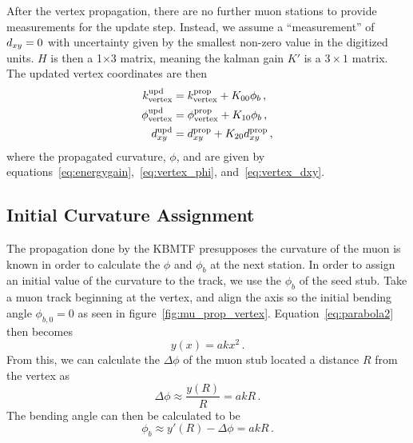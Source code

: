 After the vertex propagation, there are no further muon stations to provide measurements for the update step. Instead, we assume a ``measurement'' of $d_{xy}=0$ with uncertainty given by the smallest non-zero value in the digitized units. $H$ is then a 1$\times$3 matrix, meaning the kalman gain $K'$ is a $3\times1$ matrix. The updated vertex coordinates are then
\begin{align}
	\label{eq:kmtfUpdate_vertex}
	\begin{split}
	k_\text{vertex}^\text{upd}&=k_\text{vertex}^\text{prop}+K_{00}\phi_b\,,\\
	\phi_\text{vertex}^\text{upd}&=\phi_\text{vertex}^\text{prop}+K_{10}\phi_b\,,\\
	d_{xy}^\text{upd}&=d_{xy}^\text{prop}+K_{20}d_{xy}^\text{prop}\,,
	\end{split}
\end{align}
where the propagated curvature, $\phi$, and \dxy are given by equations~\ref{eq:energygain},~\ref{eq:vertex_phi}, and~\ref{eq:vertex_dxy}.

\subsection{Initial Curvature Assignment} \label{sec:kmtf_initk}
The propagation done by the KBMTF presupposes the curvature of the muon is known in order to calculate the $\phi$ and $\phi_b$ at the next station. In order to assign an initial value of the curvature to the track, we use the $\phi_b$ of the seed stub. Take a muon track beginning at the vertex, and align the axis so the initial bending angle $\phi_{b,0}=0$ as seen in figure~\ref{fig:mu_prop_vertex}. Equation~\ref{eq:parabola2} then becomes
\begin{equation}
	y(x)=akx^2\,.
\end{equation}
From this, we can calculate the $\Delta\phi$ of the muon stub located a distance $R$ from the vertex as
\begin{equation}
	\Delta\phi\approx\frac{y(R)}{R}=akR\,.
\end{equation}
The bending angle can then be calculated to be
\begin{equation}
	\label{eq:initPhiB}
	\phi_b\approx y'(R)-\Delta\phi=akR\,.
\end{equation}

